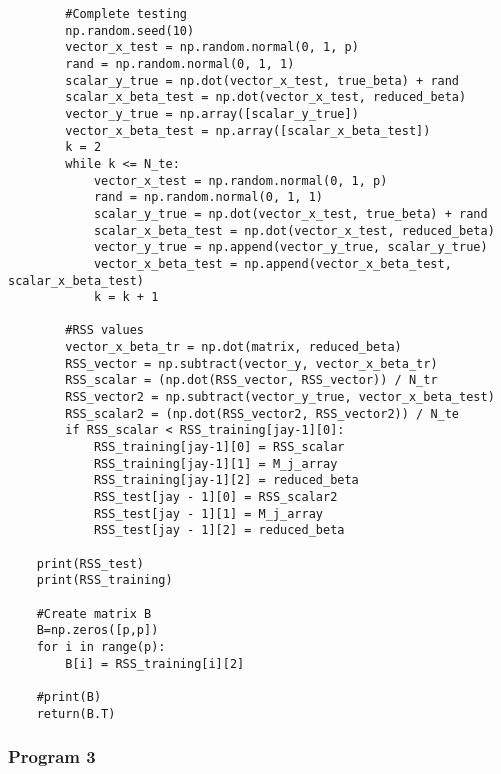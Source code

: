 \documentclass{article}
\begin{document}
\begin{lstlisting}
        #Complete testing
        np.random.seed(10)
        vector_x_test = np.random.normal(0, 1, p)
        rand = np.random.normal(0, 1, 1)
        scalar_y_true = np.dot(vector_x_test, true_beta) + rand
        scalar_x_beta_test = np.dot(vector_x_test, reduced_beta)
        vector_y_true = np.array([scalar_y_true])
        vector_x_beta_test = np.array([scalar_x_beta_test])
        k = 2
        while k <= N_te:
            vector_x_test = np.random.normal(0, 1, p)
            rand = np.random.normal(0, 1, 1)
            scalar_y_true = np.dot(vector_x_test, true_beta) + rand
            scalar_x_beta_test = np.dot(vector_x_test, reduced_beta)
            vector_y_true = np.append(vector_y_true, scalar_y_true)
            vector_x_beta_test = np.append(vector_x_beta_test, scalar_x_beta_test)
            k = k + 1

        #RSS values
        vector_x_beta_tr = np.dot(matrix, reduced_beta)
        RSS_vector = np.subtract(vector_y, vector_x_beta_tr)
        RSS_scalar = (np.dot(RSS_vector, RSS_vector)) / N_tr
        RSS_vector2 = np.subtract(vector_y_true, vector_x_beta_test)
        RSS_scalar2 = (np.dot(RSS_vector2, RSS_vector2)) / N_te
        if RSS_scalar < RSS_training[jay-1][0]:
            RSS_training[jay-1][0] = RSS_scalar
            RSS_training[jay-1][1] = M_j_array
            RSS_training[jay-1][2] = reduced_beta
            RSS_test[jay - 1][0] = RSS_scalar2
            RSS_test[jay - 1][1] = M_j_array
            RSS_test[jay - 1][2] = reduced_beta

    print(RSS_test)
    print(RSS_training)

    #Create matrix B
    B=np.zeros([p,p])
    for i in range(p):
        B[i] = RSS_training[i][2]

    #print(B)
    return(B.T)
\end{lstlisting}

\vspace{-0.5cm}
\subsubsection{Program 3}
\vspace{-0.5cm}
\label{subsec:Program 3} 
\end{document}
